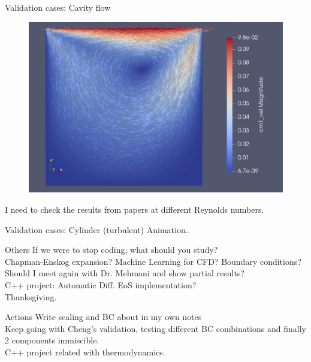 \documentclass{beamer}
\begin{document}
	\begin{frame}{Validation cases: Cavity flow}
		\label{sec:CavityFlow}
		\begin{figure}
			\includegraphics[scale=0.18]{pics/cavity.png}
		\end{figure}
	I need to check the results from papers at different Reynolds numbers.
	\end{frame}

	\begin{frame}{Validation cases: Cylinder (turbulent)}
		Animation..
	\end{frame}

	\begin{frame}{Others}
		If we were to stop coding, what should you study?\\
		Chapman-Enskog expansion? Machine Learning for CFD? Boundary conditions?\\
		Should I meet again with Dr. Mehmani and show partial results?\\
		C++ project: Automatic Diff. EoS implementation?\\
		Thanksgiving.
	\end{frame}

	\begin{frame}{Actions}
		Write scaling and BC about in my own notes\\
		Keep going with Cheng's validation, testing different BC combinations and finally 2 components immiscible.\\
		C++ project related with thermodynamics. 
	\end{frame}
	
\end{document}

